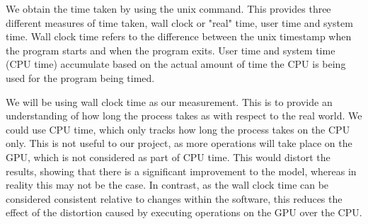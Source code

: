 We obtain the time taken by using the unix  command.
This provides three different measures of time taken, wall clock or "real" time, user time and system time.
Wall clock time refers to the difference between the unix timestamp when the program starts and when the program exits.
User time and system time (CPU time) accumulate based on the actual amount of time the CPU is being used for the program being timed.

We will be using wall clock time as our measurement.
This is to provide an understanding of how long the process takes as with respect to the real world.
We could use CPU time, which only tracks how long the process takes on the CPU only.
This is not useful to our project, as more operations will take place on the GPU, which is not considered as part of CPU time.
This would distort the results, showing that there is a significant improvement to the model, whereas in reality this may not be the case.
In contrast, as the wall clock time can be considered consistent relative to changes within the software, this reduces the effect of the distortion caused by executing operations on the GPU over the CPU. 
